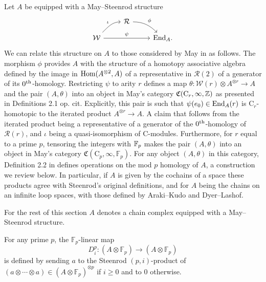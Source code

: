 Let $A$ be equipped with a May--Steenrod structure
\begin{equation*}
\begin{tikzcd}[column sep = normal, row sep = small]
& \mathcal R \arrow[dr, "\phi", out=0] & \\
\mathcal W \arrow[ur, "\iota", in=180] \arrow[rr, "\psi"] & & \End_A.
\end{tikzcd}
\end{equation*}
We can relate this structure on $A$ to those considered by May in \cite{may70generalapproach} as follows.
The morphism $\phi$ provides $A$ with the structure of a homotopy associative algebra defined by the image in $\mathrm{Hom}(A^{\otimes 2}, A)$ of a representative in $\mathcal R(2)$ of a generator of its $0^{\mathrm{th}}$-homology.
Restricting $\psi$ to arity $r$ defines a map $\theta \colon \mathcal W(r) \otimes A^{\otimes r} \to A$ and the pair $(A, \theta)$ into an object in May's category $\mathfrak{C}(\mathrm C_r, \infty, \mathbb{Z})$ as presented in Definitions 2.1 op. cit.
Explicitly, this pair is such that $\psi(e_0) \in \mathrm{End}_A(r)$ is $\mathrm C_r$-homotopic to the iterated product $A^{\otimes r} \to A$.
A claim that follows from the iterated product being a representative of a generator of the $0^{\mathrm{th}}$-homology of $\mathcal R(r)$, and $\iota$ being a quasi-isomorphism of $\mathrm C$-modules.
Furthermore, for $r$ equal to a prime $p$, tensoring the integers with $\mathbb{F}_p$ makes the pair $(A, \theta)$ into an object in May's category $\mathfrak{C}(\mathrm C_p, \infty, \mathbb{F}_p)$.
For any object $(A, \theta)$ in this category, Definition 2.2 in \cite{may70generalapproach} defines operations on the mod $p$ homology of $A$, a construction we review below.
In particular, if $A$ is given by the cochains of a space these products agree with Steenrod's original definitions, and for $A$ being the chains on an infinite loop spaces, with those defined by Araki--Kudo and Dyer--Lashof.

For the rest of this section $A$ denotes a chain complex equipped with a May--Steenrod structure.

\begin{definition}
	For any prime $p$, the $\mathbb{F}_p$-linear map
	\begin{equation*}
	D^p_i \colon (A \otimes \mathbb{F}_p) \to (A \otimes \mathbb{F}_p)
	\end{equation*}
	is defined by sending $a$ to the Steenrod \mbox{$(p, i)$-product} of $(a \otimes \cdots \otimes a) \in (A \otimes \mathbb{F}_p)^{\otimes p}$ if $i \geq 0$ and to $0$ otherwise.
\end{definition}

